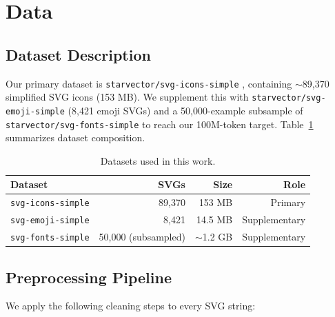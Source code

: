 \documentclass[11pt,letterpaper]{article}
\begin{document}
\section{Data}

\subsection{Dataset Description}

Our primary dataset is \texttt{starvector/svg-icons-simple} \cite{rodriguez2023starvector},
containing $\sim$89,370 simplified SVG icons (153 MB). We supplement this with
\texttt{starvector/svg-emoji-simple} (8,421 emoji SVGs) and a 50,000-example subsample of
\texttt{starvector/svg-fonts-simple} to reach our 100M-token target.
Table~\ref{tab:datasets} summarizes dataset composition.

\begin{table}[H]
\centering
\caption{Datasets used in this work.}
\label{tab:datasets}
\begin{tabular}{lrrr}
\toprule
\textbf{Dataset} & \textbf{SVGs} & \textbf{Size} & \textbf{Role} \\
\midrule
\texttt{svg-icons-simple}  & 89,370 & 153 MB & Primary \\
\texttt{svg-emoji-simple}  & 8,421  & 14.5 MB & Supplementary \\
\texttt{svg-fonts-simple}  & 50,000 (subsampled) & $\sim$1.2 GB & Supplementary \\
\bottomrule
\end{tabular}
\end{table}

\subsection{Preprocessing Pipeline}

We apply the following cleaning steps to every SVG string:
\end{document}
